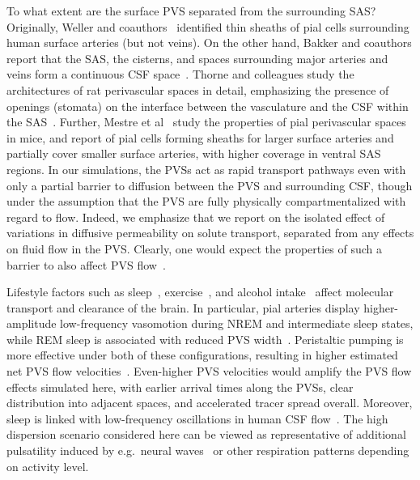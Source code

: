 \documentclass[fleqn,10pt]{wlscirep}
\begin{document}
To what extent are the surface PVS separated from the surrounding SAS?
Originally, Weller and coauthors~\cite{zhang1990interrelationships,
  zhang1992directional, weller2005microscopic} identified thin sheaths
of pial cells surrounding human surface arteries (but not veins). On
the other hand, Bakker and coauthors report that the SAS, the
cisterns, and spaces surrounding major arteries and veins form a
continuous CSF space~\cite{bedussi2017paravascular}. Thorne and
colleagues study the architectures of rat perivascular spaces in
detail, emphasizing the presence of openings (stomata) on the
interface between the vasculature and the CSF within the
SAS~\cite{pizzo2018intrathecal, hannocks2018molecular}. Further,
Mestre et al~\cite{mestre2022periarteriolar} study the properties of
pial perivascular spaces in mice, and report of pial cells forming
sheaths for larger surface arteries and partially cover smaller
surface arteries, with higher coverage in ventral SAS regions. In our
simulations, the PVSs act as rapid transport pathways even with only a
partial barrier to diffusion between the PVS and surrounding
CSF, though under the assumption that the PVS are fully physically compartmentalized with regard to flow. Indeed, we emphasize that we report on the isolated effect of variations in diffusive permeability on solute transport, separated
from any effects on fluid flow in the PVS. Clearly, one would expect
the properties of such a barrier to also affect PVS
flow~\cite{romano2020peristaltic}.

Lifestyle factors such as sleep~\cite{xie2013sleep, miao2024brain,
  bojarskaite2023sleep, eide2021sleep, vinje2023human,
  hauglund2025norepinephrine, larsen2024sleep},
exercise~\cite{holstein2018voluntary, yildiz2022immediate}, and
alcohol intake~\cite{lundgaard2018beneficial} affect molecular
transport and clearance of the brain. In particular, pial arteries
display higher-amplitude low-frequency vasomotion during NREM and
intermediate sleep states, while REM sleep is associated with reduced
PVS width~\cite{bojarskaite2023sleep}. Peristaltic pumping is more
effective under both of these configurations, resulting in higher
estimated net PVS flow
velocities~\cite{gjerde2023directional}. Even-higher PVS velocities
would amplify the PVS flow effects simulated here, with earlier
arrival times along the PVSs, clear distribution into adjacent spaces,
and accelerated tracer spread overall. Moreover, sleep is linked with
low-frequency oscillations in human CSF
flow~\cite{fultz2019coupled}. The high dispersion scenario considered
here can be viewed as representative of additional pulsatility induced by e.g.~neural waves~\cite{fultz2019coupled,
  williams2023neural} or other respiration patterns depending on
activity level.
\end{document}
